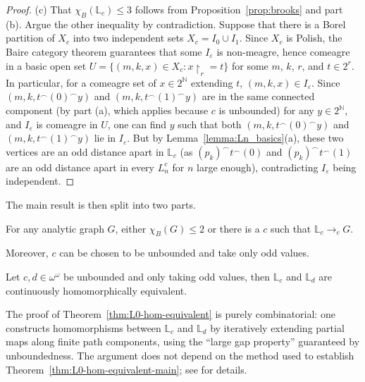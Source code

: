 \begin{proof}
    (c) That $\chi_B(\mathbb L_c)\leq3$ follows from Proposition~\ref{prop:brooks} and part (b).
    Argue the other inequality by contradiction.
    Suppose that there is a Borel partition of $X_c$ into two independent sets $X_c=I_0\cup I_1$.
    Since $X_c$ is Polish, the Baire category theorem guarantees that some $I_\varepsilon$ is non-meagre, hence comeagre in a basic open set $U=\{(m,k,x)\in X_c:x\restriction_r=t\}$ for some $m$, $k$, $r$, and $t\in2^r$.
    In particular, for a comeagre set of $x\in2^\mathbb N$ extending $t$, $(m,k,x)\in I_\varepsilon$.
    Since $(m,k,t^\smallfrown(0)^\smallfrown y)$ and $(m,k,t^\smallfrown(1)^\smallfrown y)$ are in the same connected component (by part (a), which applies because $c$ is unbounded) for any $y\in2^\mathbb N$, and $I_\varepsilon$ is comeagre in $U$, one can find $y$ such that both $(m,k,t^\smallfrown(0)^\smallfrown y)$ and $(m,k,t^\smallfrown(1)^\smallfrown y)$ lie in $I_\varepsilon$.
    But by Lemma~\ref{lemma:Ln_basics}(a), these two vertices are an odd distance apart in $\mathbb L_c$ (as $(p_k)^\smallfrown t^\smallfrown(0)$ and $(p_k)^\smallfrown t^\smallfrown(1)$ are an odd distance apart in every $L^c_n$ for $n$ large enough), contradicting $I_\varepsilon$ being independent.
\end{proof}

The main result is then split into two parts.

\begin{theorem}\label{thm:L0-hom-equivalent-main}
    For any analytic graph $G$, either $\chi_B(G)\leq 2$ or there is a $c$ such that $\mathbb L_c\to_cG$.
\end{theorem}

Moreover, $c$ can be chosen to be unbounded and take only odd values.

\begin{theorem}\label{thm:L0-hom-equivalent}
    Let $c,d\in\omega^\omega$ be unbounded and only taking odd values, then $\mathbb L_c$ and $\mathbb L_d$ are continuously homomorphically equivalent.
\end{theorem}

The proof of Theorem~\ref{thm:L0-hom-equivalent} is purely combinatorial: one constructs homomorphisms between $\mathbb L_c$ and $\mathbb L_d$ by iteratively extending partial maps along finite path components, using the ``large gap property'' guaranteed by unboundedness.
The argument does not depend on the method used to establish Theorem~\ref{thm:L0-hom-equivalent-main}; see \cite[Proposition~4.2 and Claim~4.1]{L0paper} for details.

